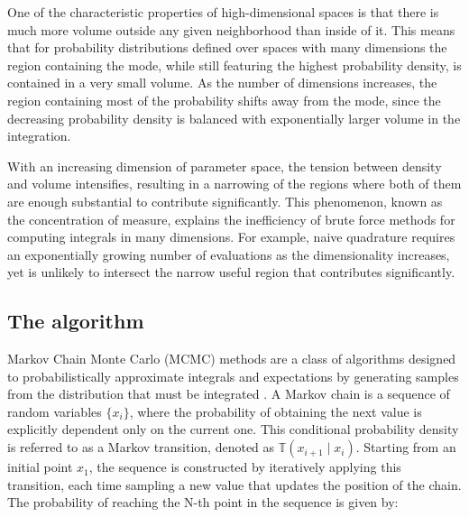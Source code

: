 One of the characteristic properties of high-dimensional spaces is that there is much more volume outside any given neighborhood than inside of it.
This means that for probability distributions defined over spaces with many dimensions the region containing the mode, while still featuring the highest probability density, is contained in a very small volume.
As the number of dimensions increases, the region containing most of the probability shifts away from the mode, since the decreasing probability density is balanced with exponentially larger volume in the integration.

With an increasing dimension of parameter space, the tension between density and volume intensifies, resulting in a
narrowing of the regions where both of them are enough substantial to contribute significantly. This phenomenon, known as the concentration of measure, explains the inefficiency of brute force methods for computing integrals in many dimensions. For example, naive quadrature requires an exponentially growing number of evaluations as the dimensionality increases, yet is unlikely to intersect the narrow useful region that contributes significantly. 





\subsection{The algorithm}
Markov Chain Monte Carlo (MCMC) methods are a class of algorithms designed to probabilistically approximate integrals
and expectations by generating samples from the distribution that must be integrated \cite{geyer2011introduction}. A Markov chain is a sequence of
random variables $\{x_i\}$, where the probability of obtaining the next value is explicitly dependent only on the
current one. This conditional probability density is referred to as a Markov transition, denoted as $\mathbb{T}(x_{i+1} \mid x_{i})$. Starting from an initial point $x_1$, the sequence is constructed by iteratively applying this transition, each time sampling a new value that updates the position of the chain. The probability of reaching the N-th point in the sequence is given by:

